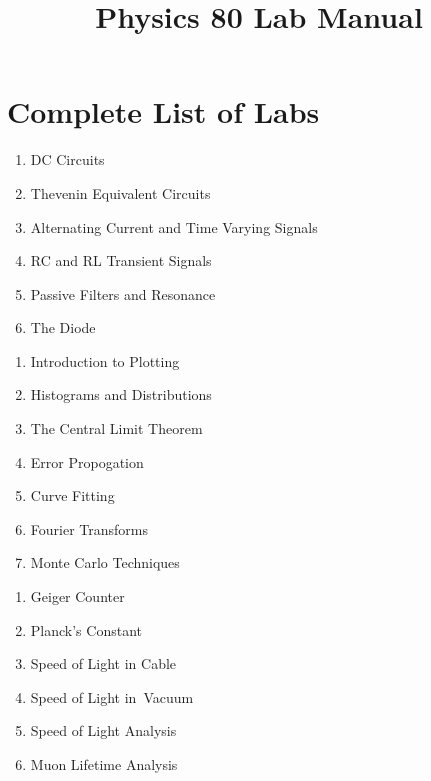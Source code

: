 \documentclass[12pt,oneside]{book}
\begin{document}

\title{Physics 80 Lab Manual}

\maketitle










\chapter{Complete List of Labs}

\begin{enumerate}
\item DC Circuits
\item Thevenin Equivalent Circuits
\item Alternating Current and Time Varying Signals
\item RC and RL Transient Signals
\item Passive Filters and Resonance
\item The Diode
\end{enumerate}

\begin{enumerate}[resume]
\item Introduction to Plotting
\item Histograms and Distributions
\item The Central Limit Theorem
\item Error Propogation
\item Curve Fitting
\item Fourier Transforms
\item Monte Carlo Techniques
\end{enumerate}

\begin{enumerate}[resume]
\item Geiger Counter
\item Planck's Constant
\item Speed of Light in Cable
\item Speed of Light in\ Vacuum
\item Speed of Light Analysis
\item Muon Lifetime Analysis
\end{enumerate}
\end{document}
